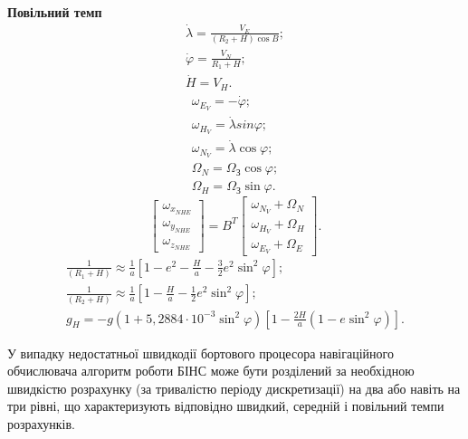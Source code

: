 \textbf{Повільний темп}
\begin{equation} 
\label{eq:geocord} 
\begin{array}{l} 
{\dot{\lambda}=\frac{V_{E}}{(R_{2}+H)\cos B};} \\ 
{\dot{\varphi}=\frac{V_{N}}{R_{1}+H} ;} \\ 
{\dot{H}=V_{H}.} 
\end{array} 
\end{equation} 
\begin{equation} 
\label{eq:__8_26_} 
\begin{array}{l} 
{\omega_{E_{V}} =-\dot{\varphi};} \\ 
{\omega_{H_{V}} =\dot{\lambda}{sin}\varphi;} \\ 
{\omega_{N_{V}} =\dot{\lambda}\cos \varphi;} \\ 
{\Omega_{N} =\Omega_{\text{З}}\cos \varphi;} \\ 
{\Omega_{H} =\Omega_{\text{З}}\sin \varphi.} 
\end{array} 
\end{equation} 
\begin{equation} 
\label{eq:lomega}
\left[\begin{array}{c} 
{\omega_{x_{NHE}}} \\ 
{\omega_{y_{NHE}}} \\ 
{\omega_{z_{NHE}}} \end{array}\right]=B^{T} 
\left[\begin{array}{c} 
{\omega_{N_{V}} +\Omega_{N}} \\ 
{\omega_{H_{V}} +\Omega_{H}} \\ 
{\omega_{E_{V}} +\Omega_{E}} 
\end{array}\right].
\end{equation}
\begin{equation} 
\label{eq:gravity} 
\begin{array}{l}{\frac{1}{(R_{1} +H)} \approx \frac{1}{a}\left[1-e^{2} -\frac{H}{a} -\frac{3}{2} e^{2} \sin ^{2} \varphi\right];} \\ 
{\frac{1}{(R_{2} +H)} \approx \frac{1}{a} \left[1-\frac{H}{a} -\frac{1}{2} e^{2} \sin ^{2}\varphi\right]  ;} \\ 
{g_{H} =-g\left(1+5,2884\cdot 10^{-3} \sin ^{2}\varphi \right)\left[1-\frac{2H}{a} \left(1-e\sin ^{2}\varphi \right)\right].} 
\end{array} 
\end{equation} 

У випадку недостатньої швидкодії бортового процесора навігаційного обчислювача алгоритм роботи БІНС може бути розділений за необхідною швидкістю розрахунку (за тривалістю періоду дискретизації) на два або навіть на три рівні, що характеризують відповідно швидкий, середній і повільний темпи розрахунків. 

